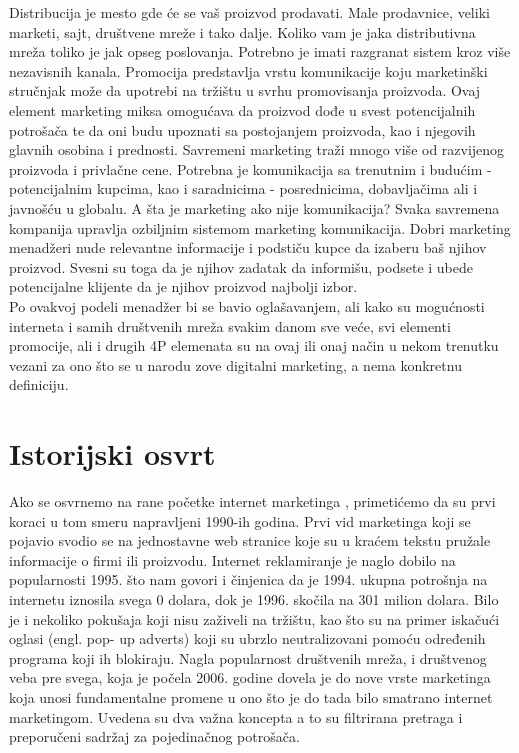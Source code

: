 \documentclass[a4paper]{article}
\begin{document}
{ Distribucija je mesto gde \'{c}e se vaš proizvod prodavati. Male prodavnice, veliki marketi, sajt, društvene mreže i tako dalje. Koliko vam je jaka distributivna mreža toliko je jak opseg poslovanja. Potrebno je imati razgranat sistem kroz više nezavisnih kanala. Promocija predstavlja vrstu komunikacije koju marketinški stručnjak može da upotrebi na tržištu u svrhu promovisanja proizvoda. Ovaj element marketing miksa omogu\'{c}ava da proizvod dođe u svest potencijalnih potrošača te da oni budu upoznati sa postojanjem proizvoda, kao i njegovih glavnih osobina i prednosti. Savremeni marketing traži mnogo više od razvijenog proizvoda i privlačne cene. Potrebna je komunikacija sa trenutnim i budućim - potencijalnim kupcima, kao i saradnicima - posrednicima, dobavljačima ali i javnošću u globalu. A šta je marketing ako nije komunikacija? Svaka savremena kompanija upravlja ozbiljnim sistemom marketing komunikacija. Dobri marketing menadžeri nude relevantne informacije i podstiču kupce da izaberu baš njihov proizvod. Svesni su toga da je njihov zadatak da informišu, podsete i ubede potencijalne klijente da je njihov proizvod najbolji izbor.\\
 Po ovakvoj podeli menadžer bi se bavio oglašavanjem, ali kako su mogućnosti interneta i samih društvenih mreža svakim danom sve veće, svi elementi promocije, ali i drugih 4P elemenata su na ovaj ili onaj način u nekom trenutku vezani za ono što se u narodu zove digitalni marketing, a nema konkretnu definiciju. 
\cite{uvod}
\newpage

\section{Istorijski osvrt}
\label{sec: Istorijski osvrt}
Ako se osvrnemo na rane početke internet marketinga , primetićemo da su prvi koraci u tom smeru napravljeni 1990-ih godina. Prvi vid marketinga koji se pojavio svodio se na jednostavne web stranice koje su u kraćem tekstu pružale informacije o firmi ili proizvodu. Internet reklamiranje je naglo dobilo na popularnosti 1995. što nam govori i činjenica da je 1994. ukupna potrošnja na internetu iznosila svega 0 dolara, dok je 1996. skočila na 301 milion dolara.
Bilo je i nekoliko pokušaja koji nisu zaživeli na tržištu, kao što su na primer iskačući oglasi (engl. pop- up adverts) koji su ubrzlo neutralizovani pomoću određenih programa koji ih blokiraju.
Nagla popularnost društvenih mreža, i društvenog veba pre svega, koja je počela 2006. godine dovela je do nove vrste marketinga koja unosi fundamentalne promene u ono što je do tada bilo smatrano internet marketingom. Uvedena su dva važna koncepta a to su filtrirana pretraga i preporučeni sadržaj za pojedinačnog potrošača.
}
\end{document}
